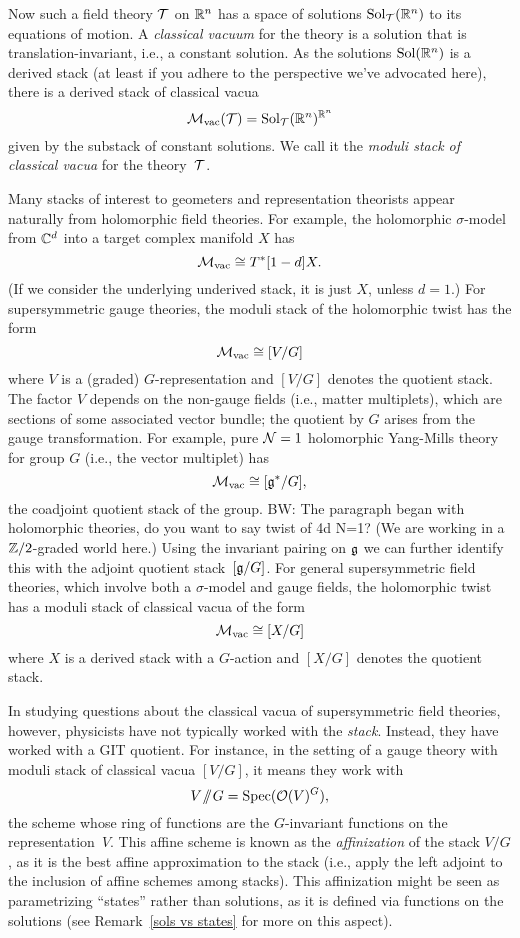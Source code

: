 \documentclass[11pt]{amsart}
\def\Sol{\text{Sol}}
\def\Spec{\text{Spec}}
\def\brian#1{{\textcolor{blue!65!red}{BW: {#1}}}}
\begin{document}
Now such a field theory $\mathcal T$ on $\mathbb R^n$ has a space of solutions $\Sol_\cT(\RR^n)$ to its equations of motion.
A {\em classical vacuum} for the theory is a solution that is translation-invariant,
i.e., a constant solution.
As the solutions $\Sol(\RR^n)$ is a derived stack (at least if you adhere to the perspective we've advocated here), there is a derived stack of classical vacua
\[
\cM_{\rm vac}(\cT) = \Sol_\cT(\RR^n)^{\RR^n}
\]
given by the substack of constant solutions.
We call it the {\em moduli stack of classical vacua} for the theory~$\mathcal T$.

Many stacks of interest to geometers and representation theorists appear naturally from holomorphic field theories.
For example, the holomorphic $\sigma$-model from $\mathbb C^d$ into a target complex manifold $X$ has
\[
\mathcal M_{\rm vac} \cong T^*[1-d]X.
\]
(If we consider the underlying underived stack, it is just $X$, unless $d = 1$.)
For supersymmetric gauge theories, the moduli stack of the holomorphic twist has the form
\[
\mathcal M_{\rm vac} \cong [V/G]
\]
where $V$ is a (graded) $G$-representation and $[V/G]$ denotes the quotient stack.
The factor $V$ depends on the non-gauge fields (i.e., matter multiplets), which are sections of some associated vector bundle;
the quotient by $G$ arises from the gauge transformation.
For example, pure $\mathcal N =1$ holomorphic Yang-Mills theory for group $G$ (i.e., the vector multiplet) has
\[
\mathcal M_{\rm vac} \cong [\mathfrak g^*/G],
\]
the coadjoint quotient stack of the group.
\brian{The paragraph began with holomorphic theories, do you want to say twist of 4d N=1?}
(We are working in a $\mathbb Z/2$-graded world here.)
Using the invariant pairing on $\mathfrak g$ we can further identify this with the adjoint quotient stack~$[\mathfrak g / G]$. 
For general supersymmetric field theories, which involve both a $\sigma$-model and gauge fields, the holomorphic twist has a moduli stack of classical vacua of the form
\[
\mathcal M_{\rm vac} \cong [X/G]
\]
where $X$ is a derived stack with a $G$-action and $[X/G]$ denotes the quotient stack.

In studying questions about the classical vacua of supersymmetric field theories, however, physicists have not typically worked with the {\em stack}.
Instead, they have worked with a GIT quotient.
For instance, in the setting of a gauge theory with moduli stack of classical vacua $[V/G]$, it means they work with 
\[
V\Sslash G = \Spec(\cO(V)^G),
\]
the scheme whose ring of functions are the $G$-invariant functions on the representation~$V$.
This affine scheme is known as the {\em affinization} of the stack $V/G$, as it is the best affine approximation to the stack (i.e., apply the left adjoint to the inclusion of affine schemes among stacks).
This affinization might be seen as parametrizing ``states'' rather than solutions, 
as it is defined via functions on the solutions (see Remark~\ref{sols vs states} for more on this aspect).
\end{document}
